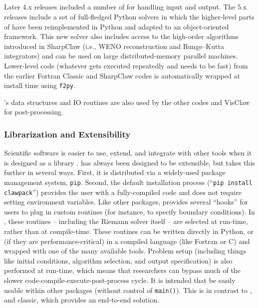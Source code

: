 %
%
%

\subsection{\pyclaw} \label{sec:pyclaw}

Later 4.x releases included a number of  for handling \clawpack input and output.  The 5.x releases include
a set of full-fledged Python solvers in which the higher-level parts of
\clawpack have been reimplemented in Python and adapted to an object-oriented
framework.  This new solver also includes access to the high-order algorithms
introduced in SharpClaw (i.e., WENO reconstruction and Runge--Kutta integrators)
and can be used on large distributed-memory parallel machines.  Lower-level code
(whatever gets executed repeatedly and needs to be fast) from the earlier
Fortran Classic and SharpClaw codes is automatically wrapped at install time
using \texttt{f2py}.

\pyclaw's data structures and IO routines are also used by the other \clawpack
codes and VisClaw for post-processing.

\subsubsection{Librarization and Extensibility}
Scientific software is easier to use, extend, and integrate with other tools when
it is designed as a library \cite{Brown:2015cj}.  \clawpack has always been designed
to be extensible, but \pyclaw takes this further in several ways.  First, it is
distributed via a widely-used package management system, \texttt{pip}.
Second, the default installation process (``\texttt{pip install clawpack}'')
provides the user with a fully-compiled code and does not require setting environment
variables.  Like other \clawpack packages, \pyclaw provides several ``hooks'' for users
to plug in custom routines (for instance, to specify boundary conditions).
In \pyclaw, these routines -- including the Riemann solver itself -- are selected at
run-time, rather than at compile-time.  These routines can be written directly in
Python, or (if they are performance-critical) in a compiled language (like Fortran or C)
and wrapped with one of the many available tools.  Problem setup (including things like
initial conditions, algorithm selection, and output specification) is also
performed at run-time, which means that researchers can bypass much of the slower
code-compile-execute-post-process cycle.
It is intended that \pyclaw be easily usable within other packages (without control of \texttt{main()}).  This is in contrast to \amrclaw, \geoclaw and classic, which provides an end-to-end solution.

